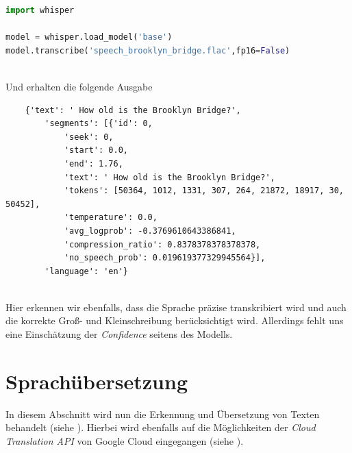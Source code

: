 \documentclass[12pt,a4paper]{article}
\begin{document}
\begin{lstlisting}[language=Python,numbers = none]
import whisper 

model = whisper.load_model('base')
model.transcribe('speech_brooklyn_bridge.flac',fp16=False)
\end{lstlisting}
\ \\
Und erhalten die folgende Ausgabe
\begin{verbatim}
	{'text': ' How old is the Brooklyn Bridge?',
		'segments': [{'id': 0,
			'seek': 0,
			'start': 0.0,
			'end': 1.76,
			'text': ' How old is the Brooklyn Bridge?',
			'tokens': [50364, 1012, 1331, 307, 264, 21872, 18917, 30, 50452],
			'temperature': 0.0,
			'avg_logprob': -0.3769610643386841,
			'compression_ratio': 0.8378378378378378,
			'no_speech_prob': 0.019619377329945564}],
		'language': 'en'}
\end{verbatim}
\ \\
Hier erkennen wir ebenfalls, dass die Sprache präzise transkribiert wird und auch die korrekte Groß- und Kleinschreibung berücksichtigt wird. Allerdings fehlt uns eine Einschätzung der \textit{Confidence} seitens des Modells.


\newpage
\section{Sprachübersetzung}

In diesem Abschnitt wird nun die Erkennung und Übersetzung von Texten behandelt (siehe  \cite{tunstall2022natural}). Hierbei wird ebenfalls auf die Möglichkeiten der \textit{Cloud Translation API} von Google Cloud eingegangen (siehe \cite{cloudtranslation2023}).
\end{document}
